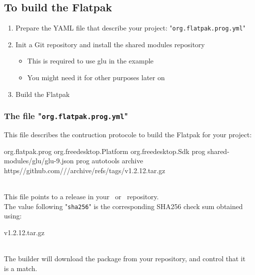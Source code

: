\subsection{To build the Flatpak}

\begin{enumerate}
\item Prepare the YAML file that describe your project: "\texttt{org.flatpak.prog.yml}"
\item Init a Git repository and install the shared modules repository
\begin{itemize}
\item This is required to use glu in the example
\item You might need it for other purposes later on
\end{itemize}
\item Build the Flatpak
\end{enumerate}

\subsubsection{The file "\texttt{org.flatpak.prog.yml}"}

This file describes the contruction protocole to build the Flatpak for your project:
{\footnotesize{
\begin{script}
 org.flatpak.prog
 org.freedesktop.Platform
 
 org.freedesktop.Sdk
 prog
  \bbtt{-} shared-modules/glu/glu-9.json
  \bbtt{-}  prog
     autotools
     
      \bbtt{-}  archive
         https//github.com///archive/refs/tags/v1.2.12.tar.gz
         
\end{script}
}}
\\[-0.5cm]
\noindent This file points to a release in your \github\ or \gitlab\ repository. \\
The value following "\texttt{sha256}" is the corresponding SHA256 check sum obtained using: 
\begin{script}
 v1.2.12.tar.gz
\end{script} \\[-0.5cm]
\noindent
The builder will download the package from your repository, and control that it is a match. 

